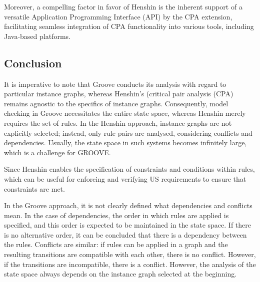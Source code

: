 Moreover, a compelling factor in favor of Henshin is the inherent support of a versatile Application Programming Interface (API) by the CPA extension, facilitating seamless integration of CPA functionality into various tools, including Java-based platforms.

\subsection{Conclusion}\label{henshin_groove_conclusion}
It is imperative to note that Groove conducts its analysis with regard to particular instance graphs, whereas Henshin's (critical pair analysis (CPA) remains agnostic to the specifics of instance graphs. Consequently, model checking in Groove necessitates the entire state space, whereas Henshin merely requires the set of rules. In the Henshin approach, instance graphs are not explicitly selected; instead, only rule pairs are analysed, considering conflicts and dependencies. Usually, the state space in such systems becomes infinitely large, which is a challenge for GROOVE.

Since Henshin enables the specification of constraints and conditions within rules, which can be useful for enforcing and verifying US requirements to ensure that constraints are met.

In the Groove approach, it is not clearly defined what dependencies and conflicts mean. In the case of dependencies, the order in which rules are applied is specified, and this order is expected to be maintained in the state space. If there is no alternative order, it can be concluded that there is a dependency between the rules. Conflicts are similar: if rules can be applied in a graph and the resulting transitions are compatible with each other, there is no conflict. However, if the transitions are incompatible, there is a conflict. However, the analysis of the state space always depends on the instance graph selected at the beginning.
